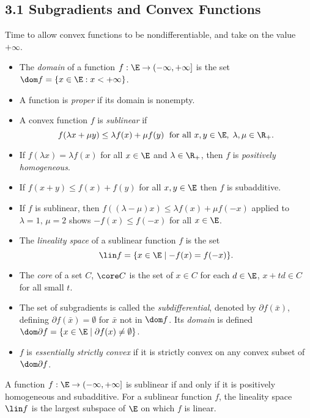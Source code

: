\documentclass[../borwein-lewis_notes.tex]{subfiles}
\begin{document}
\subsection{3.1 Subgradients and Convex Functions}
Time to allow convex functions to be nondifferentiable, and take on the 
value $+\infty$.
\begin{itemize}
\item The \textit{domain} of a function $f:\E\to(-\infty,+\infty]$ is 
the set $\dom f = \{x\in \E: x < +\infty\}$.
\item A function is \textit{proper} if its domain is nonempty.
\item A convex function $f$ is \textit{sublinear} if 
\begin{equation*}
f(\lambda x+ \mu y) \leq \lambda f(x) + \mu f(y)\;
\text{ for all } x,y\in \E,\;\lambda,\mu\in\R_+.
\end{equation*}
\item If $f(\lambda x) = \lambda f(x)$ for all $x\in \E$ and 
$\lambda\in\R_+$, then $f$ is \textit{positively homogeneous}.
\item If $f(x+y) \leq f(x)+f(y)$ for all $x,y\in\E$ then $f$ is 
subadditive.
\item If $f$ is sublinear, then $f( (\lambda-\mu)x) \leq \lambda f(x) 
+ \mu f(-x)$ applied to $\lambda=1,\,\mu=2$ shows $-f(x)\leq f(-x)$ 
for all $x\in\E$.
\item The \textit{lineality space} of a sublinear function $f$ is the set 
\begin{equation*}
\lin f = \{x\in\E \mid -f(x) = f(-x)\}.
\end{equation*}
\item The \textit{core} of a set $C$, $\core C$ is the set of $x\in C$ 
for each $d\in\E$, $x+td\in C$ for all small $t$.
\item The set of subgradients is called the \textit{subdifferential},
denoted by $\partial f(\bar x)$, defining $\partial f(\bar x)=\emptyset$
for $\bar x$ not in $\dom f$. Its \textit{domain} is defined 
$\dom\partial f = \{x\in\E\mid \partial f(x)\neq\emptyset\}$.
\item $f$ is \textit{essentially strictly convex} if it is strictly 
convex on any convex subset of $\dom\partial f$.
\end{itemize}
\begin{proposition}[3.1.1 (Sublinearity)] 
A function $f:\E\to(-\infty, +\infty]$ is sublinear if and only if it 
is positively homogeneous and subadditive. For a sublinear function $f$, 
the lineality space $\lin f$ is the largest subspace of $\E$ on which 
$f$ is linear.
\end{proposition}
\end{document}
